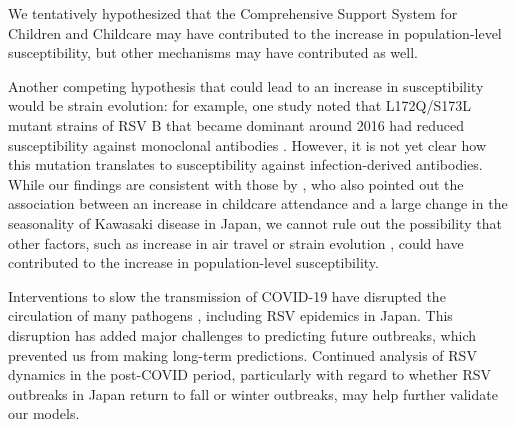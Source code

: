 \documentclass[12pt]{article}
\begin{document}
We tentatively hypothesized that the Comprehensive Support System for Children and Childcare may have contributed to the increase in population-level susceptibility, but other mechanisms may have contributed as well.


Another competing hypothesis that could lead to an increase in susceptibility would be strain evolution:
for example, one study noted that L172Q/S173L mutant strains of RSV B that became dominant around 2016 had reduced susceptibility against monoclonal antibodies \citep{okabe2024amino}.
However, it is not yet clear how this mutation translates to susceptibility against infection-derived antibodies.
While our findings are consistent with those by \cite{dehaan2024age}, who also pointed out the association between an increase in childcare attendance and a large change in the seasonality of Kawasaki disease in Japan, we cannot rule out the possibility that other factors, such as increase in air travel \citep{wagatsuma2021shifts} or strain evolution \citep{okabe2024amino}, could have contributed to the increase in population-level susceptibility.

Interventions to slow the transmission of COVID-19 have disrupted the circulation of many pathogens \citep{baker2020impact,eden2022off,chen2024covid,park2024predicting}, including RSV epidemics in Japan.
This disruption has added major challenges to predicting future outbreaks, which prevented us from making long-term predictions.
Continued analysis of RSV dynamics in the post-COVID period, particularly with regard to whether RSV outbreaks in Japan return to fall or winter outbreaks, may help further validate our models.
\end{document}
